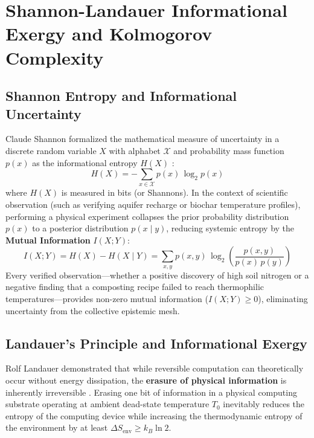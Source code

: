 \section{Shannon-Landauer Informational Exergy and Kolmogorov Complexity}
\label{sec:shannon_landauer_exergy}

\subsection{Shannon Entropy and Informational Uncertainty}
Claude Shannon formalized the mathematical measure of uncertainty in a discrete random variable $X$ with alphabet $\mathcal{X}$ and probability mass function $p(x)$ as the informational entropy $H(X)$ \cite{shannon1948}:
\begin{equation}
H(X) = - \sum_{x \in \mathcal{X}} p(x) \, \log_2 p(x)
\label{eq:shannon_entropy}
\end{equation}
where $H(X)$ is measured in bits (or Shannons). In the context of scientific observation (such as verifying aquifer recharge or biochar temperature profiles), performing a physical experiment collapses the prior probability distribution $p(x)$ to a posterior distribution $p(x \mid y)$, reducing systemic entropy by the \textbf{Mutual Information} $I(X; Y)$:
\begin{equation}
I(X; Y) = H(X) - H(X \mid Y) = \sum_{x, y} p(x, y) \, \log_2 \left( \frac{p(x, y)}{p(x) \, p(y)} \right)
\label{eq:mutual_information}
\end{equation}
Every verified observation---whether a positive discovery of high soil nitrogen or a negative finding that a composting recipe failed to reach thermophilic temperatures---provides non-zero mutual information ($I(X; Y) \ge 0$), eliminating uncertainty from the collective epistemic mesh.

\subsection{Landauer's Principle and Informational Exergy}
Rolf Landauer demonstrated that while reversible computation can theoretically occur without energy dissipation, the \textbf{erasure of physical information} is inherently irreversible \cite{landauer1961irreversibility}. Erasing one bit of information in a physical computing substrate operating at ambient dead-state temperature $T_0$ inevitably reduces the entropy of the computing device while increasing the thermodynamic entropy of the environment by at least $\Delta S_{\mathrm{env}} \ge k_B \ln 2$.

